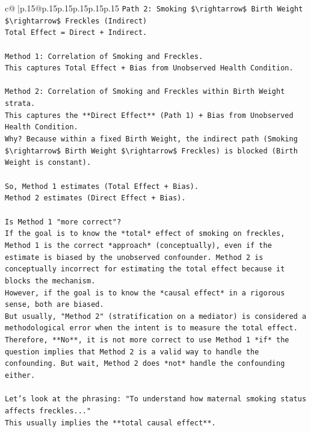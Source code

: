 \documentclass{article}
\begin{document}
{\begin{supertabular}{c@{$\;$}|p{.15\linewidth}@{}p{.15\linewidth}p{.15\linewidth}p{.15\linewidth}p{.15\linewidth}p{.15\linewidth}}
{{{\texttt{Path 2: Smoking \$\textbackslash{}rightarrow\$ Birth Weight \$\textbackslash{}rightarrow\$ Freckles (Indirect)} \\
\texttt{Total Effect = Direct + Indirect.} \\
\\ 
\texttt{Method 1: Correlation of Smoking and Freckles.} \\
\texttt{This captures Total Effect + Bias from Unobserved Health Condition.} \\
\\ 
\texttt{Method 2: Correlation of Smoking and Freckles within Birth Weight strata.} \\
\texttt{This captures the **Direct Effect** (Path 1) + Bias from Unobserved Health Condition.} \\
\texttt{Why? Because within a fixed Birth Weight, the indirect path (Smoking \$\textbackslash{}rightarrow\$ Birth Weight \$\textbackslash{}rightarrow\$ Freckles) is blocked (Birth Weight is constant).} \\
\\ 
\texttt{So, Method 1 estimates (Total Effect + Bias).} \\
\texttt{Method 2 estimates (Direct Effect + Bias).} \\
\\ 
\texttt{Is Method 1 "more correct"?} \\
\texttt{If the goal is to know the *total* effect of smoking on freckles, Method 1 is the correct *approach* (conceptually), even if the estimate is biased by the unobserved confounder. Method 2 is conceptually incorrect for estimating the total effect because it blocks the mechanism.} \\
\texttt{However, if the goal is to know the *causal effect* in a rigorous sense, both are biased.} \\
\texttt{But usually, "Method 2" (stratification on a mediator) is considered a methodological error when the intent is to measure the total effect.} \\
\texttt{Therefore, **No**, it is not more correct to use Method 1 *if* the question implies that Method 2 is a valid way to handle the confounding. But wait, Method 2 does *not* handle the confounding either.} \\
\\ 
\texttt{Let's look at the phrasing: "To understand how maternal smoking status affects freckles..."} \\
\texttt{This usually implies the **total causal effect**.} \\
}}}
\end{supertabular}}
\end{document}

